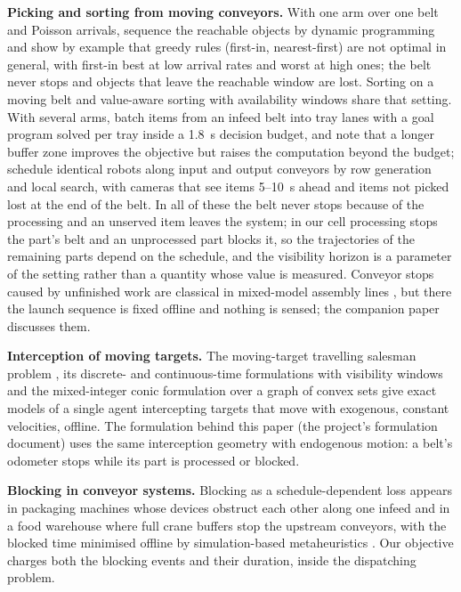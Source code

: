 \documentclass[11pt,a4paper]{article}
\begin{document}
\textbf{Picking and sorting from moving conveyors.} With one arm over one belt and
Poisson arrivals, \cite{S02_Han2020} sequence the reachable objects by dynamic
programming and show by example that greedy rules (first-in, nearest-first) are not
optimal in general, with first-in best at low arrival rates and worst at high ones; the
belt never stops and objects that leave the reachable window are lost. Sorting on a
moving belt \cite{S01_Mattone2000} and value-aware sorting with availability windows
\cite{S05_Kokkalis2026} share that setting. With several arms, \cite{S03_Nielsen2023}
batch items from an infeed belt into tray lanes with a goal program solved per tray
inside a 1.8~s decision budget, and note that a longer buffer zone improves the objective
but raises the computation beyond the budget; \cite{S04_Schettini2023} schedule
identical robots along input and output conveyors by row generation and local search,
with cameras that see items 5--10~s ahead and items not picked lost at the end of the
belt. In all of these the belt never stops because of the processing and an unserved
item leaves the system; in our cell processing stops the part's belt and an unprocessed
part blocks it, so the trajectories of the remaining parts depend on the schedule, and
the visibility horizon is a parameter of the setting rather than a quantity whose value
is measured. Conveyor stops caused by unfinished work are classical in mixed-model
assembly lines \cite{Xiaobo2000,Tamura2011}, but there the launch sequence is fixed offline
and nothing is sensed; the companion paper discusses them.

\textbf{Interception of moving targets.} The moving-target travelling salesman problem
\cite{S06_Helvig2003}, its discrete- and continuous-time formulations with visibility
windows \cite{S07_Stieber2022} and the mixed-integer conic formulation over a graph of
convex sets \cite{S08_Philip2024} give exact models of a single agent intercepting
targets that move with exogenous, constant velocities, offline. The formulation behind
this paper (the project's formulation document) uses the same interception geometry
with endogenous motion: a belt's odometer stops while its part is processed or blocked.

\textbf{Blocking in conveyor systems.} Blocking as a schedule-dependent loss appears in
packaging machines whose devices obstruct each other along one infeed
\cite{S10_Briskorn2025} and in a food warehouse where full crane buffers stop the
upstream conveyors, with the blocked time minimised offline by simulation-based
metaheuristics \cite{S11_SalviaHornos2026}. Our objective charges both the blocking
events and their duration, inside the dispatching problem.
\end{document}
